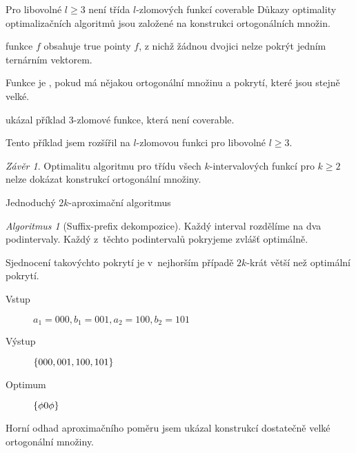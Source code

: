 \documentclass{beamer}
\theoremstyle{remark}
\newtheorem{algorithm}{Algoritmus}
\newtheorem{conclusion}{Závěr}
\begin{document}
\begin{frame}{Pro libovolné $l \geq 3$ není třída $l$-zlomových funkcí coverable}
Důkazy optimality optimalizačních algoritmů jsou založené na konstrukci ortogonálních množin.

\begin{definition}
 funkce $f$ obsahuje true pointy $f$,
z nichž žádnou dvojici nelze pokrýt jedním ternárním vektorem.

Funkce je ,
pokud má nějakou ortogonální množinu a pokrytí, které jsou stejně velké.
\end{definition}

\citet{Dubovsky2012} ukázal příklad $3$-zlomové funkce,
která není coverable.

Tento příklad jsem rozšířil na $l$-zlomovou funkci pro libovolné $l \geq 3$.

\begin{conclusion}
Optimalitu algoritmu pro třídu všech $k$-intervalových funkcí pro $k \geq 2$ nelze dokázat konstrukcí ortogonální množiny.
\end{conclusion}
\end{frame}

\begin{frame}{Jednoduchý $2k$-aproximační algoritmus}
\begin{algorithm}[Suffix-prefix dekompozice]
Každý interval rozdělíme na dva  podintervaly.
Každý z~těchto podintervalů pokryjeme zvlášť optimálně.
\end{algorithm}

Sjednocení takovýchto pokrytí je v~nejhorším případě $2k$-krát větší než optimální pokrytí.

\begin{example}
\begin{description}
\item[Vstup]
$a_1 = 000, b_1 = 001, a_2 = 100, b_2 = 101$

\item[Výstup]
$\{000, 001, 100, 101\}$

\item[Optimum]
$\{\phi 0 \phi\}$
\end{description}
\end{example}

Horní odhad aproximačního poměru jsem ukázal konstrukcí dostatečně velké ortogonální množiny.
\end{frame}
\end{document}
